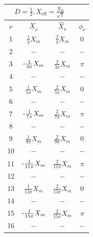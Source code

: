 \documentclass[a4paper, 12pt]{article}
\newcommand*\shortminus{\scalebox{0.5}[1.0]{\( - \)}}
\begin{document}
    \begin{center}
      \bgroup
      \def\arraystretch{1.6180339887498948}
        \begin{tabular}{@{}cccc@{}}
        \toprule
        \multicolumn{3}{c}{$D = \frac{1}{2}, X_{\text{eff}}=\frac{X_m}{\sqrt{2}}$} \\ \midrule
        $\nu$      & $\underline{X}_\nu$   & $\hat{X}_\nu$ & $\phi_\nu$ \\ \hline
        1          &  $\frac{1}{\pi} X_m$      &      $\frac{2}{\pi} X_m$&        $0$\\
        2          &  $-$         &       $-$      & $-$  \\
        3          &  $\shortminus\frac{1}{3\pi} X_m$         &   $\frac{2}{3\pi} X_m$   &        $\pi$\\
        4          &  $-$         &       $-$    &$-$    \\
        5          &  $\frac{1}{5\pi} X_m$      &       $\frac{2}{5\pi} X_m$    &  $0$ \\
        6          &  $-$         &       $-$    & $-$   \\
        7          &  $\shortminus\frac{1}{7\pi} X_m$         &          $\frac{2}{7\pi}X_m$  & $\pi$\\
        8          &  $-$         &       $-$     & $-$   \\
        9          &  $\frac{1}{9\pi} X_m$         &       $\frac{2}{9\pi} X_m$   &  $0$   \\
        10         &  $-$         &       $-$       & $-$ \\
        11         &  $\shortminus\frac{1}{11\pi} X_m$         &       $\frac{2}{11\pi} X_m$  &   $\pi$ \\
        12         &  $-$         &       $-$      & $-$  \\
        13         &  $\frac{1}{13\pi} X_m$         &      $\frac{2}{13\pi} X_m$ &   $0$   \\
        14         &  $-$         &      $-$       & $-$  \\
        15         &  $\shortminus\frac{1}{15\pi} X_m$         &      $\frac{2}{15\pi} X_m$   &  $\pi$  \\
        16         &  $-$         &       $-$      & $-$  \\ \bottomrule
        \end{tabular}
        \hspace{0.6180339887498948cm}
        \begin{tabular}{@{}ccc@{}}

\end{tabular}
\end{center}
\end{document}
